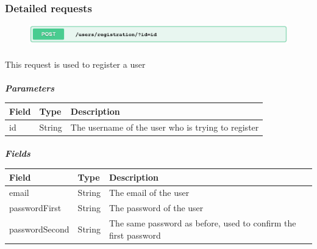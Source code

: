 				\subsubsection{Detailed requests}
					\begin{figure}[!h]
						\includegraphics[width=\textwidth]{images/Restful/UserRegistration}
					\end{figure}
						\paragraph{}
						\vspace{-7.5mm}
						This request is used to register a user
					\paragraph{}
						\textcolor{myBlue}{\textit{\textbf{Parameters}}}
						\vspace{-2mm}
						\begin{table}[!h]
							\begin{tabular}{L{0.2\textwidth}L{0.2\textwidth}L{0.48\textwidth}}
								\toprule
								\textbf{Field} & \textbf{Type} & \textbf{Description} \\
								\midrule
								 id & String & The username of the user who is trying to register \\
								 \bottomrule
							\end{tabular}
						\end{table}
					\vspace{-5mm}
					\paragraph{}
						\textcolor{myBlue}{\textit{\textbf{Fields}}}
						\vspace{-2mm}
						\begin{table}[!h]
							\centering
							\begin{tabular}{L{0.25\textwidth}L{0.15\textwidth}L{0.48\textwidth}}
								\toprule
								\textbf{Field} & \textbf{Type} & \textbf{Description} \\
								\midrule
								 email & String & The email of the user \\
								 passwordFirst & String & The password of the user \\
								 passwordSecond & String & The same password as before, used to confirm the first password \\
								 \bottomrule
							\end{tabular}
						\end{table}
